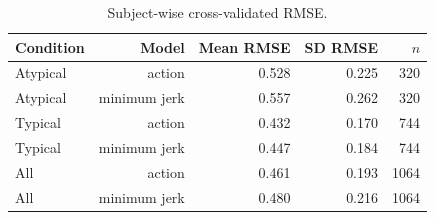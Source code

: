 \begin{table}[htbp]
\centering
\caption{Subject-wise cross-validated RMSE.}
\label{tab:rmse}
\begin{tabular}{l r r r r}
\toprule
Condition & Model & Mean RMSE & SD RMSE & $n$ \\
\midrule
Atypical & action & 0.528 & 0.225 & 320 \\
Atypical & minimum jerk & 0.557 & 0.262 & 320 \\
Typical & action & 0.432 & 0.170 & 744 \\
Typical & minimum jerk & 0.447 & 0.184 & 744 \\
All & action & 0.461 & 0.193 & 1064 \\
All & minimum jerk & 0.480 & 0.216 & 1064 \\
\bottomrule
\end{tabular}
\end{table}
